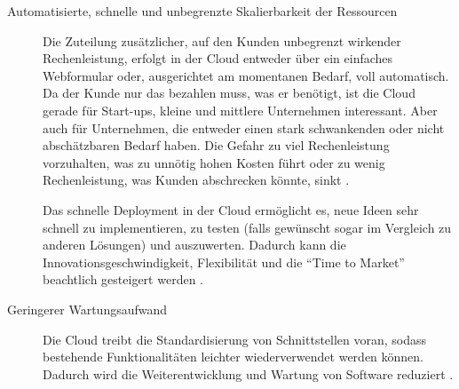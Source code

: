 \begin{description}
	\item[Automatisierte, schnelle und unbegrenzte Skalierbarkeit der
Ressourcen] Die Zuteilung zusätzlicher, auf den Kunden unbegrenzt wirkender
Rechenleistung, erfolgt in der Cloud entweder über ein einfaches Webformular oder,
ausgerichtet am momentanen Bedarf, voll automatisch. Da der Kunde nur das
bezahlen muss, was er benötigt, ist die Cloud gerade für Start-ups, kleine und
mittlere Unternehmen interessant. Aber auch für Unternehmen, die entweder einen stark
schwankenden oder nicht abschätzbaren Bedarf haben. Die Gefahr zu viel
Rechenleistung vorzuhalten, was zu unnötig hohen Kosten führt oder zu wenig
Rechenleistung, was Kunden abschrecken könnte,
sinkt 
.

Das schnelle Deployment in der Cloud ermöglicht es, neue Ideen sehr
schnell zu implementieren, zu testen (falls gewünscht sogar im Vergleich zu
anderen Lösungen) und auszuwerten. Dadurch kann die Innovationsgeschwindigkeit,
Flexibilität und die "`Time to Market"' beachtlich gesteigert werden 
.

	\item[Geringerer Wartungsaufwand] Die Cloud treibt die Standardisierung
von Schnittstellen voran, sodass bestehende Funktionalitäten leichter
wiederverwendet werden können. Dadurch wird die Weiterentwicklung und Wartung
von Software reduziert .
\end{description}

